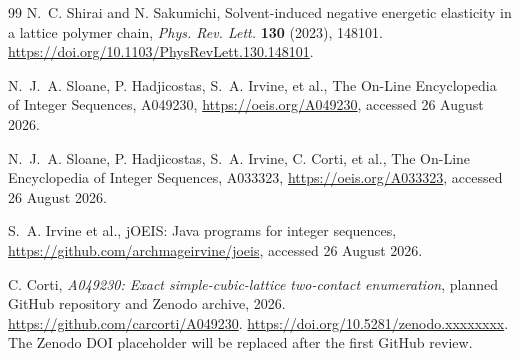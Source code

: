 \documentclass[11pt]{article}
\theoremstyle{definition}
\theoremstyle{remark}
\begin{document}
\begin{thebibliography}{99}
N.~C. Shirai and N. Sakumichi,
\newblock Solvent-induced negative energetic elasticity in a lattice polymer
chain,
\newblock \emph{Phys. Rev. Lett.} \textbf{130} (2023), 148101.
\url{https://doi.org/10.1103/PhysRevLett.130.148101}.

N.~J.~A. Sloane, P. Hadjicostas, S.~A. Irvine, et al.,
\newblock The On-Line Encyclopedia of Integer Sequences, A049230,
\newblock \url{https://oeis.org/A049230}, accessed 26 August 2026.

N.~J.~A. Sloane, P. Hadjicostas, S.~A. Irvine, C. Corti, et al.,
\newblock The On-Line Encyclopedia of Integer Sequences, A033323,
\newblock \url{https://oeis.org/A033323}, accessed 26 August 2026.

S.~A. Irvine et al.,
\newblock jOEIS: Java programs for integer sequences,
\newblock \url{https://github.com/archmageirvine/joeis}, accessed 26 August
2026.

C. Corti,
\newblock \emph{A049230: Exact simple-cubic-lattice two-contact enumeration},
\newblock planned GitHub repository and Zenodo archive, 2026.
\url{https://github.com/carcorti/A049230}.
\url{https://doi.org/10.5281/zenodo.xxxxxxxx}.
The Zenodo DOI placeholder will be replaced after the first GitHub review.

\end{thebibliography}
\end{document}
